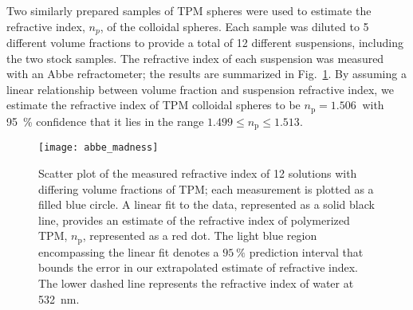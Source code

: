 Two similarly prepared samples of TPM spheres were used to estimate the refractive
index, $n_p$, of the colloidal spheres.
Each sample was diluted to \num{5} different volume fractions to provide a total of
\num{12} different suspensions, including the two stock samples.
The refractive index of each
suspension was measured with an Abbe refractometer;
the results are summarized in Fig.~\ref{fig:abbe}.
By assuming a linear relationship between volume fraction and suspension refractive
index, we estimate the refractive index of TPM colloidal spheres to be $n_{\text{p}} = \SI{1.506}{}$ with \SI{95}{\percent} confidence that it lies in the range $1.499 \le n_{\text{p}} \le 1.513$.

\begin{figure}
    \centering
    \texttt{[image: abbe\_madness]}
    \caption{Scatter plot of the measured refractive index of \num{12} solutions
      with differing volume fractions of TPM; each measurement is plotted as a filled
      blue circle.
      A linear fit to the data, represented as a solid black line, provides an estimate of
      the refractive index of polymerized TPM, $n_{\text{p}}$, represented as a red dot.
      The light blue region encompassing the linear fit denotes a $\SI{95}{\percent}$
      prediction interval that bounds the error in our extrapolated estimate of refractive
      index.
      The lower dashed line represents the refractive index of water at \SI{532}{\nm}.}
    \label{fig:abbe}
\end{figure}


